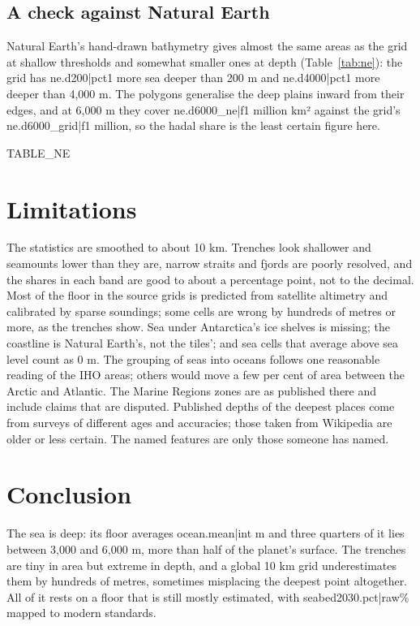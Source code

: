 \documentclass[11pt,a4paper]{article}
\begin{document}
\subsection{A check against Natural Earth}
Natural Earth's hand-drawn bathymetry gives almost the same areas as the grid at shallow thresholds and somewhat smaller ones at depth (Table~\ref{tab:ne}): the grid has {{ne.d200|pct1}} more sea deeper than 200 m and {{ne.d4000|pct1}} more deeper than 4,000 m. The polygons generalise the deep plains inward from their edges, and at 6,000 m they cover {{ne.d6000_ne|f1}} million km² against the grid's {{ne.d6000_grid|f1}} million, so the hadal share is the least certain figure here.

{{TABLE_NE}}

\section{Limitations}
The statistics are smoothed to about 10 km. Trenches look shallower and seamounts lower than they are, narrow straits and fjords are poorly resolved, and the shares in each band are good to about a percentage point, not to the decimal. Most of the floor in the source grids is predicted from satellite altimetry and calibrated by sparse soundings; some cells are wrong by hundreds of metres or more, as the trenches show. Sea under Antarctica's ice shelves is missing; the coastline is Natural Earth's, not the tiles'; and sea cells that average above sea level count as 0 m. The grouping of seas into oceans follows one reasonable reading of the IHO areas; others would move a few per cent of area between the Arctic and Atlantic. The Marine Regions zones are as published there and include claims that are disputed. Published depths of the deepest places come from surveys of different ages and accuracies; those taken from Wikipedia are older or less certain. The named features are only those someone has named.

\section{Conclusion}
The sea is deep: its floor averages {{ocean.mean|int}} m and three quarters of it lies between 3,000 and 6,000 m, more than half of the planet's surface. The trenches are tiny in area but extreme in depth, and a global 10 km grid underestimates them by hundreds of metres, sometimes misplacing the deepest point altogether. All of it rests on a floor that is still mostly estimated, with {{seabed2030.pct|raw}}\% mapped to modern standards.
\end{document}
